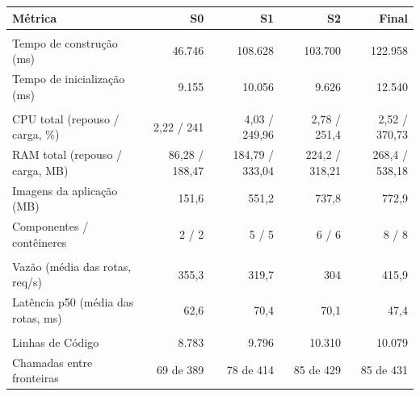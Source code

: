 \begin{quadro}[htb]
  \centering
  \caption{Inventário --- métricas por snapshot --- Subdomínio (DDD).}
  \label{qua:comp_inventory-api_subdominio_snapshots}
  \renewcommand{\arraystretch}{1.15}
  \begin{tabularx}{\textwidth}{|>{\raggedright\arraybackslash}X|r|r|r|r|}
    \hline
    \textbf{Métrica} & \textbf{S0} & \textbf{S1} & \textbf{S2} & \textbf{Final} \\
    \hline
    \multicolumn{5}{|l|}{\textbf{Agilidade}} \\
    \hline
    Tempo de construção (ms) & 46.746 & 108.628 & 103.700 & 122.958 \\
    Tempo de inicialização (ms) & 9.155 & 10.056 & 9.626 & 12.540 \\
    \hline
    \multicolumn{5}{|l|}{\textbf{Custo}} \\
    \hline
    CPU total (repouso / carga, \%) & 2,22 / 241 & 4,03 / 249,96 & 2,78 / 251,4 & 2,52 / 370,73 \\
    RAM total (repouso / carga, MB) & 86,28 / 188,47 & 184,79 / 333,04 & 224,2 / 318,21 & 268,4 / 538,18 \\
    Imagens da aplicação (MB) & 151,6 & 551,2 & 737,8 & 772,9 \\
    Componentes / contêineres & 2 / 2 & 5 / 5 & 6 / 6 & 8 / 8 \\
    \hline
    \multicolumn{5}{|l|}{\textbf{Desempenho}} \\
    \hline
    Vazão (média das rotas, req/s) & 355,3 & 319,7 & 304 & 415,9 \\
    Latência p50 (média das rotas, ms) & 62,6 & 70,4 & 70,1 & 47,4 \\
    \hline
    \multicolumn{5}{|l|}{\textbf{Manutenibilidade}} \\
    \hline
    Linhas de Código & 8.783 & 9.796 & 10.310 & 10.079 \\
    Chamadas entre fronteiras & 69 de 389 & 78 de 414 & 85 de 429 & 85 de 431 \\
    \hline
  \end{tabularx}
\end{quadro}

